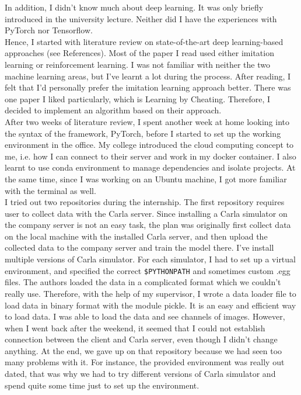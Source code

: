 \documentclass[inputenc=utf8]{ldvarticle}
\def\code#1{\texttt{#1}}
\begin{document}
\noindent In addition, I didn’t know much about deep learning. It was only briefly introduced in the university lecture. Neither did I have the experiences with PyTorch nor Tensorflow.
\\

\noindent Hence, I started with literature review on state-of-the-art deep learning-based approaches (see References). Most of the paper I read used either imitation learning or reinforcement learning. I was not familiar with neither the two machine learning areas, but I’ve learnt a lot during the process. After reading, I felt that I’d personally prefer the imitation learning approach better. There was one paper I liked particularly, which is \cite{chen2019lbc} Learning by Cheating. Therefore, I decided to implement an algorithm based on their approach.
\\

\noindent After two weeks of literature review, I spent another week at home looking into the syntax of the framework, PyTorch, before I started to set up the working environment in the office. My college introduced the cloud computing concept to me, i.e. how I can connect to their server and work in my docker container. I also learnt to use conda environment to manage dependencies and isolate projects. At the same time, since I was working on an Ubuntu machine, I got more familiar with the terminal as well.
\\

\noindent I tried out two repositories during the internship. The first repository requires user to collect data with the Carla server. Since installing a Carla simulator on the company server is not an easy task, the plan was originally first collect data on the local machine with the installed Carla server, and then upload the collected data to the company server and train the model there. I’ve install multiple versions of Carla simulator. For each simulator, I had to set up a virtual environment, and specified the correct \code{\$PYTHONPATH} and sometimes custom .egg files. The authors loaded the data in a complicated format which we couldn’t really use. Therefore, with the help of my supervisor, I wrote a data loader file to load data in binary format with the module pickle. It is an easy and efficient way to load data. I was able to load the data and see channels of images. However, when I went back after the weekend, it seemed that I could not establish connection between the client and Carla server, even though I didn’t change anything. At the end, we gave up on that repository because we had seen too many problems with it. For instance, the provided environment was really out dated, that was why we had to try different versions of Carla simulator and spend quite some time just to set up the environment.
\\
\end{document}
